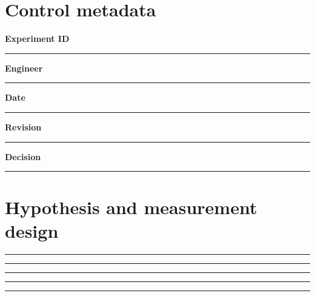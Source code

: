\documentclass[11pt,letterpaper]{article}
\begin{document}
\makedoctitle\makedocsummary
\section{Control metadata}
\noindent\textbf{Experiment ID}\par\nobreak\vspace{6pt}\noindent\rule{0.93\linewidth}{0.4pt}\par\vspace{14pt}
\noindent\textbf{Engineer}\par\nobreak\vspace{6pt}\noindent\rule{0.93\linewidth}{0.4pt}\par\vspace{14pt}
\noindent\textbf{Date}\par\nobreak\vspace{6pt}\noindent\rule{0.93\linewidth}{0.4pt}\par\vspace{14pt}
\noindent\textbf{Revision}\par\nobreak\vspace{6pt}\noindent\rule{0.93\linewidth}{0.4pt}\par\vspace{14pt}
\noindent\textbf{Decision}\par\nobreak\vspace{6pt}\noindent\rule{0.93\linewidth}{0.4pt}\par\vspace{14pt}
\section{Hypothesis and measurement design}
\vspace{2mm}
\noindent\rule{0.93\linewidth}{0.4pt}\par\vspace{13pt}
\noindent\rule{0.93\linewidth}{0.4pt}\par\vspace{13pt}
\noindent\rule{0.93\linewidth}{0.4pt}\par\vspace{13pt}
\noindent\rule{0.93\linewidth}{0.4pt}\par\vspace{13pt}
\noindent\rule{0.93\linewidth}{0.4pt}\par\vspace{13pt}
\end{document}
